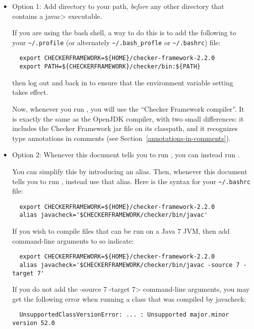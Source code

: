 \begin{itemize}
  \item
    Option 1:
    Add directory
     to your path, \emph{before} any other
    directory that contains a \<javac> executable.

    If you are
    using the bash shell, a way to do this is to add the following to your
    \verb|~/.profile| (or alternately \verb|~/.bash_profle| or \verb|~/.bashrc|) file:
\begin{Verbatim}
  export CHECKERFRAMEWORK=${HOME}/checker-framework-2.2.0
  export PATH=${CHECKERFRAMEWORK}/checker/bin:${PATH}
\end{Verbatim}
    then log out and back in to ensure that the environment variable
    setting takes effect.

    Now, whenever you run , you will use the ``Checker
    Framework compiler''.  It is exactly the same as the OpenJDK compiler,
    with two small differences:  it includes the Checker Framework jar file
    on its classpath, and it recognizes type annotations in comments (see
    Section~\ref{annotations-in-comments}).

  \item
    \begin{sloppypar}
    Option 2:
    Whenever this document tells you to run , you
    can instead run .
    \end{sloppypar}

    You can simplify this by introducing an alias.  Then,
    whenever this document tells you to run , instead use that
    alias.  Here is the syntax for your
    \verb|~/.bashrc| file:
\begin{Verbatim}
  export CHECKERFRAMEWORK=${HOME}/checker-framework-2.2.0
  alias javacheck='$CHECKERFRAMEWORK/checker/bin/javac'
\end{Verbatim}

    If you wish to compile files that can be run on a Java 7 JVM, then add
    command-line arguments to so indicate:

\begin{Verbatim}
  export CHECKERFRAMEWORK=${HOME}/checker-framework-2.2.0
  alias javacheck='$CHECKERFRAMEWORK/checker/bin/javac -source 7 -target 7'
\end{Verbatim}

   If you do not add the \<-source 7 -target 7> command-line arguments, you
   may get the following error when running a class that was compiled by
   javacheck:
\begin{Verbatim}
  UnsupportedClassVersionError: ... : Unsupported major.minor version 52.0
\end{Verbatim}


\end{itemize}
